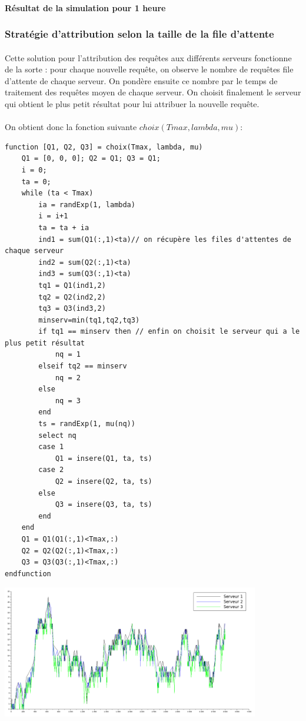 \documentclass{article}
\begin{document}
\paragraph{Résultat de la simulation pour 1 heure}

\subsubsection{Stratégie d'attribution selon la taille de la file d'attente}

\paragraph{}
Cette solution pour l'attribution des requêtes aux différents serveurs fonctionne de la sorte :  pour chaque nouvelle requête, on observe le nombre de requêtes file d'attente de chaque serveur. On pondère ensuite ce nombre par le temps de traitement des requêtes moyen de chaque serveur. On choisit finalement le serveur qui obtient le plus petit résultat pour lui attribuer la nouvelle requête.

\paragraph{}On obtient donc la fonction suivante $choix(Tmax,lambda,mu)$:
\begin{verbatim}
function [Q1, Q2, Q3] = choix(Tmax, lambda, mu)
    Q1 = [0, 0, 0]; Q2 = Q1; Q3 = Q1;
    i = 0;
    ta = 0; 
    while (ta < Tmax)
        ia = randExp(1, lambda)
        i = i+1 
        ta = ta + ia 
        ind1 = sum(Q1(:,1)<ta)// on récupère les files d'attentes de chaque serveur
        ind2 = sum(Q2(:,1)<ta)
        ind3 = sum(Q3(:,1)<ta)
        tq1 = Q1(ind1,2)
        tq2 = Q2(ind2,2)
        tq3 = Q3(ind3,2)
        minserv=min(tq1,tq2,tq3)
        if tq1 == minserv then // enfin on choisit le serveur qui a le plus petit résultat
            nq = 1
        elseif tq2 == minserv
            nq = 2
        else
            nq = 3
        end
        ts = randExp(1, mu(nq))
        select nq 
        case 1 
            Q1 = insere(Q1, ta, ts)
        case 2 
            Q2 = insere(Q2, ta, ts)
        else
            Q3 = insere(Q3, ta, ts)
        end
    end
    Q1 = Q1(Q1(:,1)<Tmax,:)
    Q2 = Q2(Q2(:,1)<Tmax,:)
    Q3 = Q3(Q3(:,1)<Tmax,:)
endfunction
\end{verbatim}

\begin{center}
	\includegraphics[width=425px]{img/choix.png}
\end{center}
\end{document}
